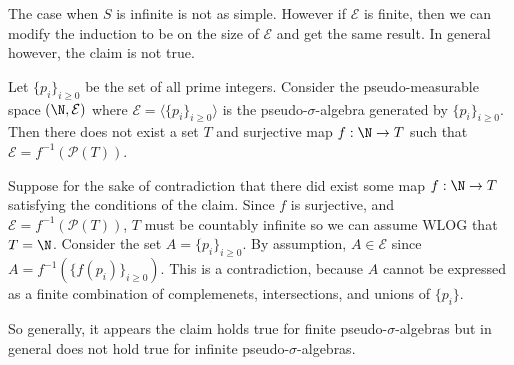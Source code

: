 \documentclass[11pt,letterpaper]{article}
\begin{document}
The case when $S$ is infinite is not as simple. However if $\mathcal{E}$ is finite, then we can modify the induction to be on the size of $\mathcal{E}$ and get the same result. In general however, the claim is not true. 

\begin{counterexample}
    Let $\{p_i\}_{i\geq 0}$ be the set of all prime integers. Consider the pseudo-measurable space $(\N, \mathcal{E})$ where $\mathcal{E} = \langle \{p_i\}_{i\geq 0}\rangle$ is the pseudo-$\sigma$-algebra generated by $\{p_i\}_{i\geq 0}$. Then there does not exist a set $T$ and surjective map $f : \N \to T$ such that $\mathcal{E} = f^{-1}(\mathcal{P}(T))$.   
\end{counterexample}
\begin{cproof}
    Suppose for the sake of contradiction that there did exist some map $f : \N \to T$ satisfying the conditions of the claim. Since $f$ is surjective, and $\mathcal{E}=f^{-1}(\mathcal{P}(T))$, $T$ must be countably infinite so we can assume WLOG that $T=\N$. Consider the set $A=\{p_i\}_{i\geq 0}$. By assumption, $A\in \mathcal{E}$ since $A=f^{-1}\left(\{f(p_i)\}_{i\geq 0}\right)$. This is a contradiction, because $A$ cannot be expressed as a finite combination of complemenets, intersections, and unions of $\{p_i\}$.
\end{cproof}

So generally, it appears the claim holds true for finite pseudo-$\sigma$-algebras but in general does not hold true for infinite pseudo-$\sigma$-algebras.

\end{document}
